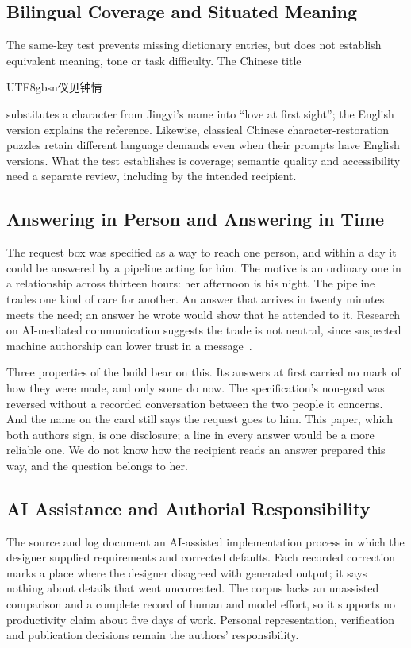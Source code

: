 \documentclass[sigconf,nonacm]{acmart}
\newcommand{\zh}[1]{\begingroup\normalfont\begin{CJK*}{UTF8}{gbsn}#1\end{CJK*}\endgroup}
\begin{document}
\subsection{Bilingual Coverage and Situated Meaning}
The same-key test prevents missing dictionary entries, but does not establish equivalent meaning,
tone or task difficulty. The Chinese title \zh{仪见钟情} substitutes a character from Jingyi's name
into ``love at first sight''; the English version explains the reference. Likewise, classical
Chinese character-restoration puzzles retain different language demands even when their prompts
have English versions. What the test establishes is coverage; semantic quality and accessibility
need a separate review, including by the intended recipient.

\subsection{Answering in Person and Answering in Time}\label{sec:delegated}
The request box was specified as a way to reach one person, and within a day it could be answered
by a pipeline acting for him. The motive is an ordinary one in a relationship across thirteen
hours: her afternoon is his night. The pipeline trades one kind of care for another.
An answer that arrives in twenty minutes meets the need; an answer he wrote would show that he
attended to it. Research on AI-mediated communication suggests the trade is not neutral, since
suspected machine authorship can lower trust in a message~\cite{hancock2020aimc,jakesch2019aimc}.

Three properties of the build bear on this. Its answers at first carried no mark of how they
were made, and only some do now. The specification's non-goal was reversed without a recorded conversation between the two
people it concerns. And the name on the card still says the request goes to him. This paper,
which both authors sign, is one disclosure; a line in every answer would be a more reliable one.
We do not know how the recipient reads an answer prepared this way, and the question belongs to
her.

\subsection{AI Assistance and Authorial Responsibility}
The source and log document an AI-assisted implementation process in which the designer supplied
requirements and corrected defaults. Each recorded correction marks a place where the designer
disagreed with generated output; it says nothing about details that went uncorrected. The corpus
lacks an unassisted comparison and a complete record of human and model effort, so it supports no
productivity claim about five days of work. Personal representation, verification and publication
decisions remain the authors' responsibility.
\end{document}
